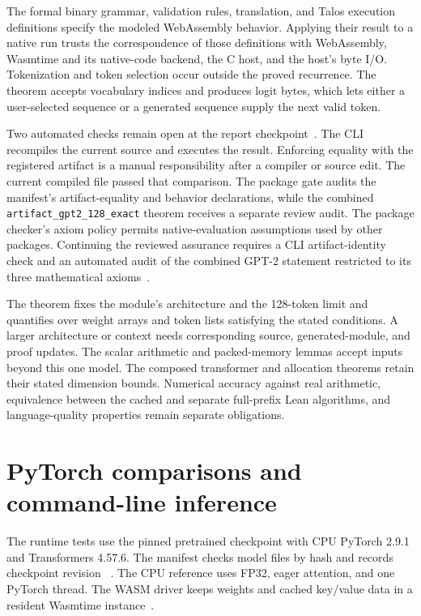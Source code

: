 \documentclass[11pt]{article}
\newcommand{\code}[1]{\texttt{#1}}
\newcommand{\longcode}[1]{\texttt{\seqsplit{#1}}}
\begin{document}
The formal binary grammar, validation rules, translation, and Talos execution definitions specify the modeled WebAssembly behavior.  Applying their result to a native run trusts the correspondence of those definitions with WebAssembly, Wasmtime and its native-code backend, the C host, and the host's byte I/O.  Tokenization and token selection occur outside the proved recurrence.  The theorem accepts vocabulary indices and produces logit bytes, which lets either a user-selected sequence or a generated sequence supply the next valid token.

Two automated checks remain open at the report checkpoint~\cite{review}.  The CLI recompiles the current source and executes the result.  Enforcing equality with the registered artifact is a manual responsibility after a compiler or source edit.  The current compiled file passed that comparison.  The package gate audits the manifest's artifact-equality and behavior declarations, while the combined \code{artifact\_gpt2\_128\_exact} theorem receives a separate review audit.  The package checker's axiom policy permits native-evaluation assumptions used by other packages.  Continuing the reviewed assurance requires a CLI artifact-identity check and an automated audit of the combined GPT-2 statement restricted to its three mathematical axioms~\cite{driver,artifactgate}.

The theorem fixes the module's architecture and the 128-token limit and quantifies over weight arrays and token lists satisfying the stated conditions.  A larger architecture or context needs corresponding source, generated-module, and proof updates.  The scalar arithmetic and packed-memory lemmas accept inputs beyond this one model.  The composed transformer and allocation theorems retain their stated dimension bounds.  Numerical accuracy against real arithmetic, equivalence between the cached and separate full-prefix Lean algorithms, and language-quality properties remain separate obligations.

\section{PyTorch comparisons and command-line inference}\label{sec:tests}

The runtime tests use the pinned pretrained checkpoint with CPU PyTorch 2.9.1 and Transformers 4.57.6.  The manifest checks model files by hash and records checkpoint revision \longcode{607a30d783dfa663caf39e06633721c8d4cfcd7e}~\cite{manifest}.  The CPU reference uses FP32, eager attention, and one PyTorch thread.  The WASM driver keeps weights and cached key/value data in a resident Wasmtime instance~\cite{driver}.
\end{document}
